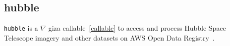 \subsection{hubble}
\label{hubble}

\texttt{hubble} is a $\nabla$ giza callable~\ref{callable} to access and process Hubble Space Telescope imagery and other datasets on AWS Open Data Registry~. 
